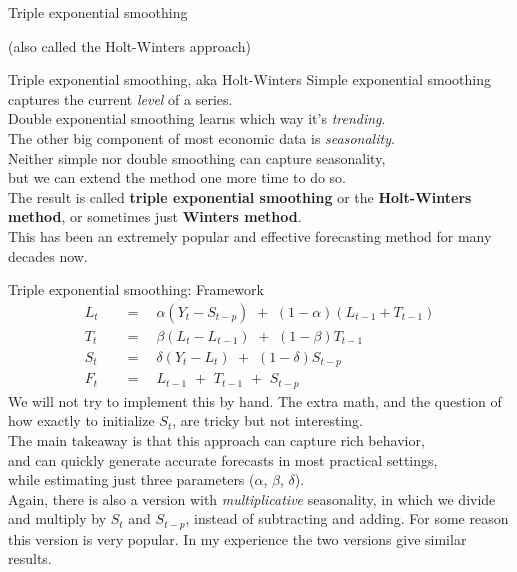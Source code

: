 \documentclass[t,12pt]{beamer}
\begin{document}
	\begin{frame}[c]
	\vfill
	\centerline{Triple exponential smoothing}
	\centerline{(also called the Holt-Winters approach)}
	\vfill
	\end{frame}

	\begin{frame}[c]{Triple exponential smoothing, aka Holt-Winters}
	Simple exponential smoothing captures the current \emph{level} of a series. 
	\\
	Double exponential smoothing learns which way it's \emph{trending}.
	\\ 
	The other big component of most economic data is \emph{seasonality}.
	\\ \bigskip
	Neither simple nor double smoothing can capture seasonality,
	\\ but we can extend the method one more time to do so.
	\\ \bigskip
	The result is called \textbf{triple exponential smoothing} or the \textbf{Holt-Winters method}, or sometimes just \textbf{Winters method}.
	\\ \bigskip
	This has been an extremely popular and effective forecasting method for many decades now.
	\end{frame}

	\begin{frame}[c]{Triple exponential smoothing: Framework}
	\vspace{-0.4in}
	\begin{align*}
	L_t \quad &= \quad \alpha (Y_t-S_{t-p}) \,\, + \,\, (1-\alpha)(L_{t-1} + T_{t-1})
	\\
	T_t \quad &= \quad \beta (L_t - L_{t-1}) \,\, + \,\, (1-\beta) T_{t-1}
	\\
	S_t \quad &= \quad \delta (Y_t - L_t) \,\, + \,\, (1-\delta) S_{t-p}
	\\
	F_t \quad &= \quad L_{t-1} \,\, + \,\, T_{t-1} \,\, + \,\, S_{t-p}
	\end{align*}
	We will not try to implement this by hand. 
	The extra math, and the question of how exactly to initialize $S_t$, are tricky but not interesting.
	\\ \medskip
	The main takeaway is that this approach can capture rich behavior, 
	\\ and can quickly generate accurate forecasts in most practical settings,
	\\ while estimating just three parameters ($\alpha$, $\beta$, $\delta$).
	\\ \smallskip
	{\footnotesize
	Again, there is also a version with \emph{multiplicative} seasonality, 
	in which we divide and multiply by $S_t$ and $S_{t-p}$, instead of subtracting and adding.
	For some reason this version is very popular.
	In my experience the two versions give similar results.}
	\end{frame}
\end{document}
